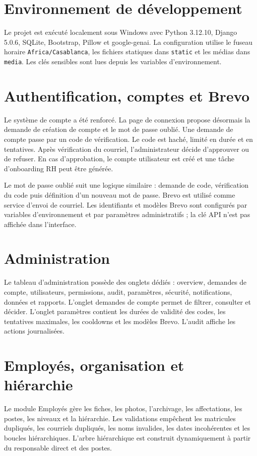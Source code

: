 \documentclass[12pt,a4paper]{report}
\begin{document}
\section{Environnement de développement}
Le projet est exécuté localement sous Windows avec Python 3.12.10, Django 5.0.6, SQLite, Bootstrap, Pillow et google-genai. La configuration utilise le fuseau horaire \texttt{Africa/Casablanca}, les fichiers statiques dans \texttt{static} et les médias dans \texttt{media}. Les clés sensibles sont lues depuis les variables d'environnement.

\section{Authentification, comptes et Brevo}
Le système de compte a été renforcé. La page de connexion propose désormais la demande de création de compte et le mot de passe oublié. Une demande de compte passe par un code de vérification. Le code est haché, limité en durée et en tentatives. Après vérification du courriel, l'administrateur décide d'approuver ou de refuser. En cas d'approbation, le compte utilisateur est créé et une tâche d'onboarding RH peut être générée.

Le mot de passe oublié suit une logique similaire : demande de code, vérification du code puis définition d'un nouveau mot de passe. Brevo est utilisé comme service d'envoi de courriel. Les identifiants et modèles Brevo sont configurés par variables d'environnement et par paramètres administratifs ; la clé API n'est pas affichée dans l'interface.

\section{Administration}
Le tableau d'administration possède des onglets dédiés : overview, demandes de compte, utilisateurs, permissions, audit, paramètres, sécurité, notifications, données et rapports. L'onglet demandes de compte permet de filtrer, consulter et décider. L'onglet paramètres contient les durées de validité des codes, les tentatives maximales, les cooldowns et les modèles Brevo. L'audit affiche les actions journalisées.

\section{Employés, organisation et hiérarchie}
Le module Employés gère les fiches, les photos, l'archivage, les affectations, les postes, les niveaux et la hiérarchie. Les validations empêchent les matricules dupliqués, les courriels dupliqués, les noms invalides, les dates incohérentes et les boucles hiérarchiques. L'arbre hiérarchique est construit dynamiquement à partir du responsable direct et des postes.
\end{document}
